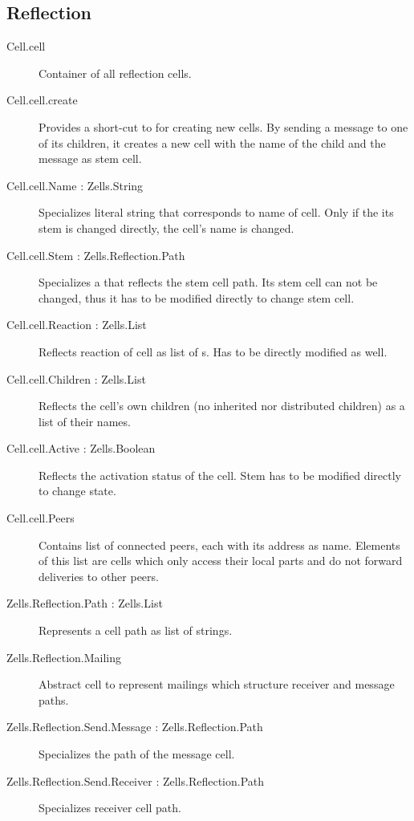 \subsection{Reflection}
\begin{description}
\item[Cell.cell]{Container of all reflection cells.}

\item[Cell.cell.create]{Provides a short-cut to for creating new cells. By sending a message to one of its children, it creates a new cell with the name of the child and the message as stem cell.}

\item[Cell.cell.Name : Zells.String]{Specializes literal string that corresponds to name of cell. Only if the its stem is changed directly, the cell's name is changed.}

\item[Cell.cell.Stem : Zells.Reflection.Path]{Specializes a  that reflects the stem cell path. Its stem cell can not be changed, thus it has to be modified directly to change stem cell.}

\item[Cell.cell.Reaction : Zells.List]{Reflects reaction of cell as list of s. Has to be directly modified as well.}

\item[Cell.cell.Children : Zells.List]{Reflects the cell's own children (no inherited nor distributed children) as a list of their names.}

\item[Cell.cell.Active : Zells.Boolean]{Reflects the activation status of the cell. Stem has to be modified directly to change state.}

\item[Cell.cell.Peers]{Contains list of connected peers, each with its address as name. Elements of this list are cells which only access their local parts and do not forward deliveries to other peers.}

\item[Zells.Reflection.Path : Zells.List]{Represents a cell path as list of strings.}

\item[Zells.Reflection.Mailing]{Abstract cell to represent mailings which structure receiver and message paths.}

\item[Zells.Reflection.Send.Message : Zells.Reflection.Path]{Specializes the path of the message cell.}

\item[Zells.Reflection.Send.Receiver : Zells.Reflection.Path]{Specializes receiver cell path.}

\end{description}
